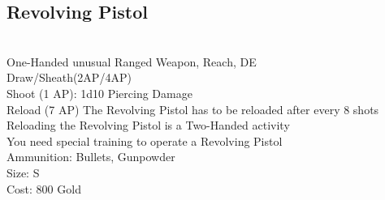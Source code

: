\subsection{Revolving Pistol}\label{weapon:revolvingPistol}\\
One-Handed unusual Ranged Weapon,  Reach, DE\\
Draw/Sheath(2AP/4AP)\\
Shoot (1 AP): 1d10 Piercing Damage\\
Reload (7 AP) The Revolving Pistol has to be reloaded after every 8 shots\\
Reloading the Revolving Pistol is a Two-Handed activity\\
You need special training to operate a Revolving Pistol\\
Ammunition: Bullets, Gunpowder\\
Size: S\\
Cost: 800 Gold\\